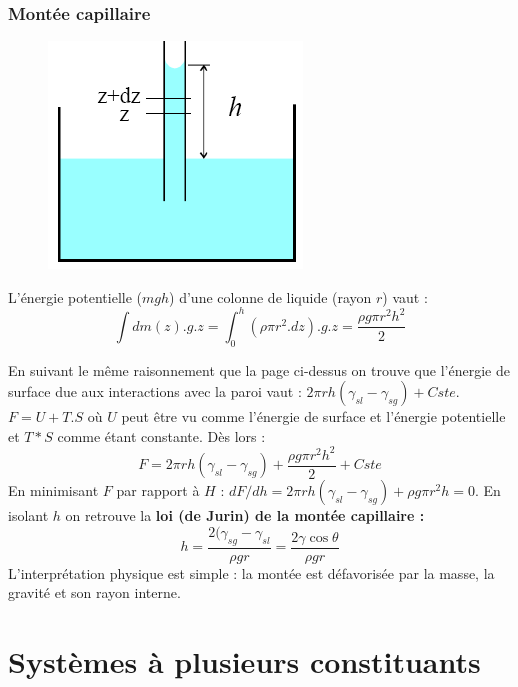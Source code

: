 \documentclass[11pt, a4paper, openany]{book}
\begin{document}
		\subsubsection{Montée capillaire}
		\begin{figure}
			\includegraphics[scale=0.4]{cp/image16.png}
		\end{figure}
		L'énergie potentielle ($mgh$) d'une colonne de liquide (rayon $r$) vaut :
		\begin{equation}
			\int dm(z).g.z = \int_0^h (\rho \pi r^2.dz).g.z = \frac{\rho g \pi r^2 h^2}{2}
		\end{equation}
		
		En suivant le même raisonnement que la page ci-dessus on trouve que l'énergie de surface due aux interactions avec la paroi vaut : $2\pi r h(\gamma_{sl}-\gamma_{sg}) + Cste$.\\
		$F = U + T.S$ où $U$ peut être vu comme l'énergie de surface et l'énergie potentielle et $T*S$ comme étant constante. Dès lors : 
		\begin{equation}
			F = 2\pi r h(\gamma_{sl}-\gamma_{sg}) + \frac{\rho g \pi r^2 h^2}{2} + Cste
		\end{equation}
		En minimisant $F$ par rapport à $H$ : $dF/dh = 2\pi r h(\gamma_{sl}-\gamma_{sg}) + \rho g \pi r^2 h = 0$. En isolant $h$ on retrouve la \textbf{loi (de Jurin) de la montée capillaire :}
		\begin{equation}
			h = \frac{2(\gamma_{sg}-\gamma_{sl}}{\rho g r} = \frac{2\gamma \cos\theta}{\rho g r}
		\end{equation}
		L'interprétation physique est simple : la montée est défavorisée par la masse, la gravité et son rayon interne.
		
		\section{Systèmes à plusieurs constituants}
\end{document}
